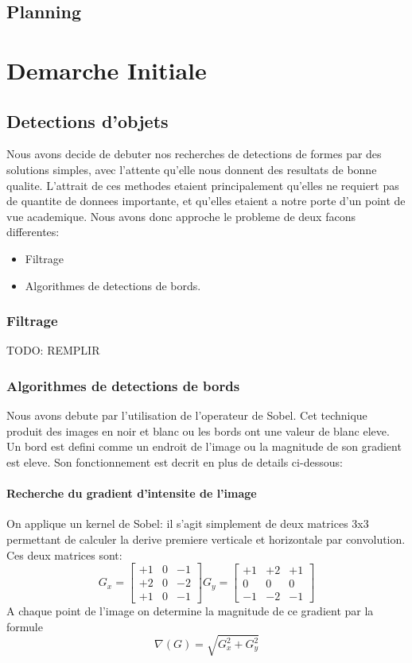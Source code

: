 \documentclass[a4paper, 12pt, titlepage, oneside]{article}
\begin{document}
	\subsection{Planning}

	\newpage

\section{Demarche Initiale}
	\subsection{Detections d'objets}
	Nous avons decide de debuter nos recherches de detections de formes par des solutions simples, avec l'attente qu'elle nous donnent des resultats de bonne qualite. L'attrait de ces 
	methodes etaient principalement qu'elles ne requiert pas de quantite de donnees importante, et qu'elles etaient a notre porte d'un point de vue academique. Nous avons donc approche
	le probleme de deux facons differentes:
	\begin{itemize}
		\item Filtrage
		\item Algorithmes de detections de bords.
	\end{itemize}
	\subsubsection{Filtrage}
	{TODO: REMPLIR}
	
	\subsubsection{Algorithmes de detections de bords}
	Nous avons debute par l'utilisation de l'operateur de Sobel. Cet technique produit des images en noir et blanc ou les bords ont une valeur de blanc eleve. Un bord est defini comme un endroit de l'image ou la magnitude de son gradient est eleve. Son fonctionnement est decrit en plus de details ci-dessous: 
		\paragraph{\textbf{Recherche du gradient d'intensite de l'image}}
				On applique un kernel de Sobel: il s'agit simplement de deux matrices 3x3 permettant de calculer la derive premiere verticale et horizontale par convolution. Ces deux matrices sont:
				\\ \[G_x = \begin{bmatrix}  +1  & 0 & -1 \\ +2 & 0 & -2  \\ +1 &  0 & -1\end{bmatrix} 
					 G_y = \begin{bmatrix} +1 & +2 & +1  \\  0 & 0 &  0  \\ -1 & -2 & -1\end{bmatrix}\]
	A chaque point de l'image on determine la magnitude de ce gradient par la formule
					\[\nabla(G) = \sqrt{G_x^2 + G_y^2}\]
\end{document}
